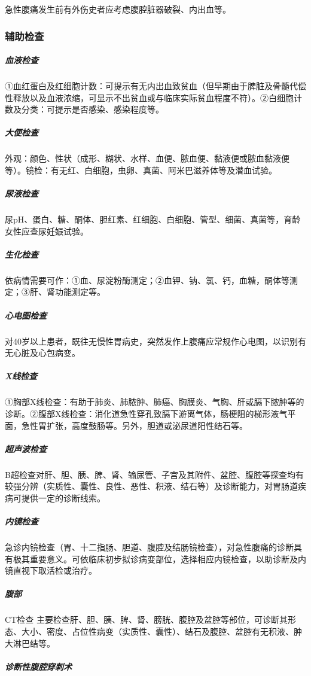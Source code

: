 急性腹痛发生前有外伤史者应考虑腹腔脏器破裂、内出血等。

\subsubsection{辅助检查}

\subparagraph{血液检查}

①血红蛋白及红细胞计数：可提示有无内出血致贫血（但早期由于脾脏及骨髓代偿性释放以及血液浓缩，可显示不出贫血或与临床实际贫血程度不符）。②白细胞计数及分类：可提示是否感染、感染程度等。

\subparagraph{大便检查}

外观：颜色、性状（成形、糊状、水样、血便、脓血便、黏液便或脓血黏液便等）。镜检：有无红、白细胞，虫卵、真菌、阿米巴滋养体等及潜血试验。

\subparagraph{尿液检查}

尿pH、蛋白、糖、酮体、胆红素、红细胞、白细胞、管型、细菌、真菌等，育龄女性应查尿妊娠试验。

\subparagraph{生化检查}

依病情需要可作：①血、尿淀粉酶测定；②血钾、钠、氯、钙，血糖，酮体等测定；③肝、肾功能测定等。

\subparagraph{心电图检查}

对40岁以上患者，既往无慢性胃病史，突然发作上腹痛应常规作心电图，以识别有无心脏及心包病变。

\subparagraph{X线检查}

①胸部X线检查：有助于肺炎、肺脓肿、肺癌、胸膜炎、气胸、肝或膈下脓肿等的诊断。②腹部X线检查：消化道急性穿孔致膈下游离气体，肠梗阻的梯形液气平面，急性胃扩张，高度鼓肠等。另外，胆道或泌尿道阳性结石等。

\subparagraph{超声波检查}

B超检查对肝、胆、胰、脾、肾、输尿管、子宫及其附件、盆腔、腹腔等探查均有较强分辨（实质性、囊性、良性、恶性、积液、结石等）及诊断能力，对胃肠道疾病可提供一定的诊断线索。

\subparagraph{内镜检查}

急诊内镜检查（胃、十二指肠、胆道、腹腔及结肠镜检查），对急性腹痛的诊断具有极其重要意义。可依临床初步拟诊病变部位，选择相应内镜检查，以助诊断及内镜直视下取活检或治疗。

\subparagraph{腹部}

CT检查
主要检查肝、胆、胰、脾、肾、膀胱、腹腔及盆腔等部位，可诊断其形态、大小、密度、占位性病变（实质性、囊性）、结石及腹腔、盆腔有无积液、肿大淋巴结等。

\subparagraph{诊断性腹腔穿刺术}

